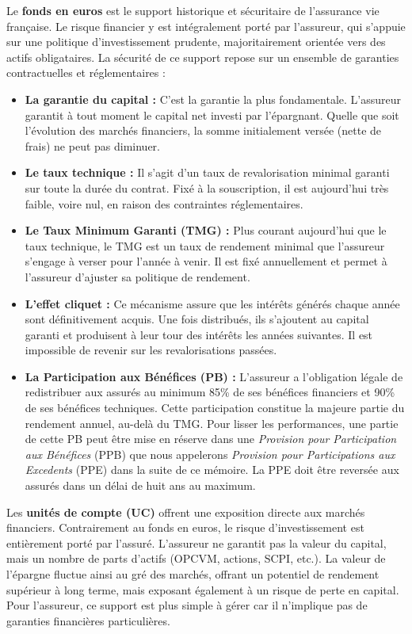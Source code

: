 Le \textbf{fonds en euros} est le support historique et sécuritaire de l'assurance vie française. Le risque financier y est intégralement porté par l'assureur, qui s'appuie sur une politique d'investissement prudente, majoritairement orientée vers des actifs obligataires. La sécurité de ce support repose sur un ensemble de garanties contractuelles et réglementaires :
\begin{itemize}
    \item \textbf{La garantie du capital :} C'est la garantie la plus fondamentale. L'assureur garantit à tout moment le capital net investi par l'épargnant. Quelle que soit l'évolution des marchés financiers, la somme initialement versée (nette de frais) ne peut pas diminuer.
    \item \textbf{Le taux technique :} Il s'agit d'un taux de revalorisation minimal garanti sur toute la durée du contrat. Fixé à la souscription, il est aujourd'hui très faible, voire nul, en raison des contraintes réglementaires.
    \item \textbf{Le Taux Minimum Garanti (TMG) :} Plus courant aujourd'hui que le taux technique, le TMG est un taux de rendement minimal que l'assureur s'engage à verser pour l'année à venir. Il est fixé annuellement et permet à l'assureur d'ajuster sa politique de rendement.
    \item \textbf{L'effet cliquet :} Ce mécanisme assure que les intérêts générés chaque année sont définitivement acquis. Une fois distribués, ils s'ajoutent au capital garanti et produisent à leur tour des intérêts les années suivantes. Il est impossible de revenir sur les revalorisations passées.
    \item \textbf{La Participation aux Bénéfices (PB) :} L'assureur a l'obligation légale de redistribuer aux assurés au minimum 85\% de ses bénéfices financiers et 90\% de ses bénéfices techniques. Cette participation constitue la majeure partie du rendement annuel, au-delà du TMG. Pour lisser les performances, une partie de cette PB peut être mise en réserve dans une \textit{Provision pour Participation aux Bénéfices} (PPB) que nous appelerons \textit{Provision pour Participations aux Excedents} (PPE) dans la suite de ce mémoire. La PPE doit être reversée aux assurés dans un délai de huit ans au maximum.
\end{itemize}


Les \textbf{unités de compte (UC)} offrent une exposition directe aux marchés financiers. Contrairement au fonds en euros, le risque d'investissement est entièrement porté par l'assuré. L'assureur ne garantit pas la valeur du capital, mais un nombre de parts d'actifs (OPCVM, actions, SCPI, etc.). La valeur de l'épargne fluctue ainsi au gré des marchés, offrant un potentiel de rendement supérieur à long terme, mais exposant également à un risque de perte en capital. Pour l'assureur, ce support est plus simple à gérer car il n'implique pas de garanties financières particulières.


